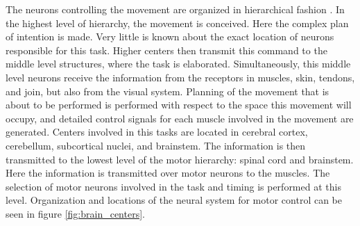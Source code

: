The neurons controlling the movement are organized in hierarchical fashion \citep{Widmaier2014}. In the highest level of hierarchy, the movement is conceived. Here the complex plan of intention is made. Very little is known about the exact location of neurons responsible for this task. Higher centers then transmit this command to the middle level structures, where the task is elaborated. Simultaneously, this middle level neurons receive the information from the receptors in muscles, skin, tendons, and join, but also from the visual system. Planning of the movement that is about to be performed is performed with respect to the space this movement will occupy, and detailed control signals for each muscle involved in the movement are generated. Centers involved in this tasks are located in cerebral cortex, cerebellum, subcortical nuclei, and brainstem. The information is then transmitted to the lowest level of the motor hierarchy: spinal cord and brainstem. Here the information is transmitted over motor neurons to the muscles. The selection of motor neurons involved in the task and timing is performed at this level. Organization and locations of the neural system for motor control can be seen in figure \ref{fig:brain_centers}. 

